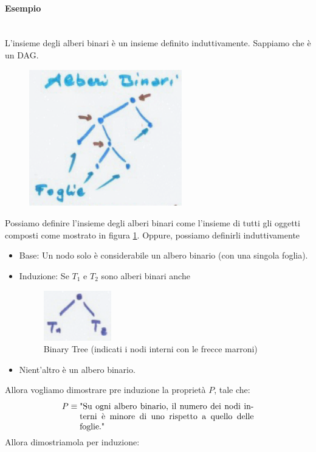 \documentclass{article}
\begin{document}
\paragraph{Esempio}\mbox{}\\
L'insieme degli alberi binari è un insieme definito induttivamente. Sappiamo che è un DAG.
\begin{figure}[H]
    \centering
    \includegraphics[scale=0.5]{images/BT.png}
    \label{fig:bt}
\end{figure}
Possiamo definire l'insieme degli alberi binari come l'insieme di tutti gli oggetti composti come
mostrato in figura \ref{fig:bt}. Oppure, possiamo definirli induttivamente
\begin{itemize}
    \item Base: Un nodo solo è considerabile un albero binario (con una singola foglia).
    \item Induzione: Se $T_1$ e $T_2$ sono alberi binari anche
          \begin{figure}[H]
              \centering
              \includegraphics[scale=0.6]{images/BT_1.png}
              \caption{Binary Tree (indicati i nodi interni con le frecce marroni)}
          \end{figure}
    \item Nient'altro è un albero binario.
\end{itemize}
Allora vogliamo dimostrare pre induzione la proprietà $P$, tale che:
$$P\equiv \parbox[t]{.6\textwidth}{"Su ogni albero binario, il numero dei nodi interni è minore di uno rispetto
        a quello delle foglie."}$$
Allora dimostriamola per induzione:
\end{document}
